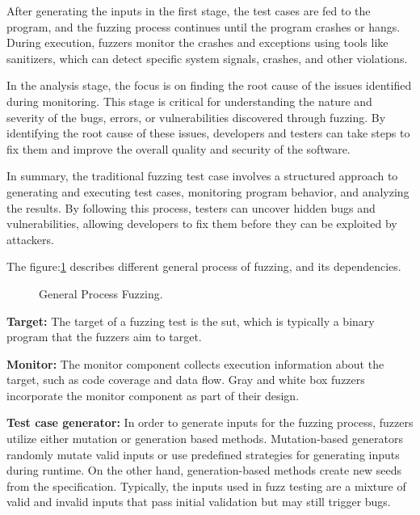 After generating the inputs in the first stage, the test cases are fed to
the program, and the fuzzing process continues until the program crashes or hangs.
During execution, fuzzers monitor the crashes and exceptions using tools
like sanitizers, which can detect specific system signals, crashes, and other violations.

In the analysis stage, the focus is on finding the root cause of the issues
identified during monitoring. This stage is critical for understanding the nature and
severity of the bugs, errors, or vulnerabilities discovered through fuzzing.
By identifying the root cause of these issues, developers and testers can take
steps to fix them and improve the overall quality and security of the software.

In summary, the traditional fuzzing test case involves a structured approach
to generating and executing test cases, monitoring program behavior,
and analyzing the results. By following this process, testers can uncover hidden
bugs and vulnerabilities, allowing developers to fix them before they can be
exploited by attackers.

The figure:\ref{fig:general_process_fuzzing} describes different general process of fuzzing, and
its dependencies.

\begin{figure}[h!]
        \centering
        \caption{General Process Fuzzing\cite{liang2018fuzzing}.}\label{fig:general_process_fuzzing}
\end{figure}

\textbf{Target:} The target of a fuzzing test is the \acrlong{sut}, which is
typically a binary program that the fuzzers aim to target.

\textbf{Monitor:} The monitor component collects execution information about the target,
such as code coverage and data flow. Gray and white box fuzzers
incorporate the monitor component as part of their design.

\textbf{Test case generator:} In order to generate inputs for the fuzzing process,
fuzzers utilize either mutation or generation based methods. Mutation-based
generators randomly mutate valid inputs or use predefined strategies for
generating inputs during runtime. On the other hand, generation-based methods
create new seeds from the specification. Typically, the inputs used in fuzz
testing are a mixture of valid and invalid inputs that pass initial validation
but may still trigger bugs.

